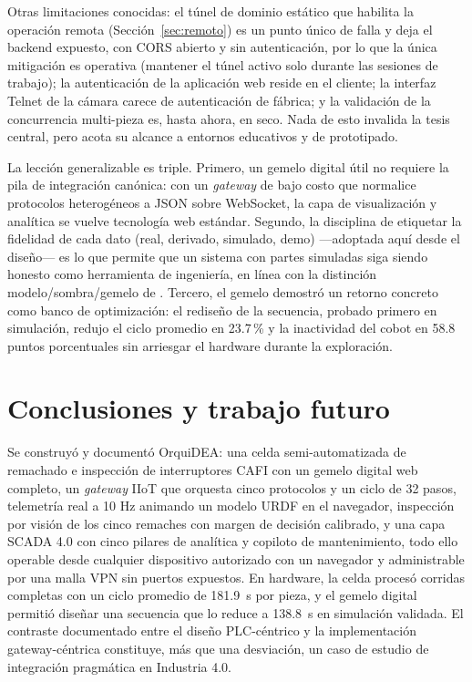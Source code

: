 \documentclass{styles/svproc}
\begin{document}
Otras limitaciones conocidas: el túnel de dominio estático que habilita la
operación remota (Sección~\ref{sec:remoto}) es un punto único de falla y
deja el backend expuesto, con CORS abierto y sin autenticación, por lo que
la única mitigación es operativa (mantener el túnel activo solo durante
las sesiones de trabajo); la autenticación de la
aplicación web reside en el cliente;
la interfaz Telnet de la cámara carece de autenticación de fábrica; y la
validación de la concurrencia multi-pieza es, hasta ahora, en seco. Nada de
esto invalida la tesis central, pero acota su alcance a entornos educativos
y de prototipado.

La lección generalizable es triple. Primero, un gemelo digital útil no
requiere la pila de integración canónica: con un \emph{gateway} de bajo
costo que normalice protocolos heterogéneos a JSON sobre WebSocket, la capa
de visualización y analítica se vuelve tecnología web estándar. Segundo, la
disciplina de etiquetar la fidelidad de cada dato (real, derivado, simulado,
demo) ---adoptada aquí desde el diseño--- es lo que permite que un sistema
con partes simuladas siga siendo honesto como herramienta de ingeniería, en
línea con la distinción modelo/sombra/gemelo de
\cite{kritzinger2018digital}. Tercero, el gemelo demostró un retorno
concreto como banco de optimización: el rediseño de la secuencia, probado
primero en simulación, redujo el ciclo promedio en 23.7\,\% y la
inactividad del cobot en 58.8 puntos porcentuales sin arriesgar el
hardware durante la exploración.

\section{Conclusiones y trabajo futuro}
Se construyó y documentó OrquiDEA: una celda semi-automatizada de remachado
e inspección de interruptores CAFI con un gemelo digital web completo, un
\emph{gateway} IIoT que orquesta cinco protocolos y un ciclo de 32 pasos,
telemetría real a 10 Hz animando un modelo URDF en el navegador, inspección
por visión de los cinco remaches con margen de decisión calibrado, y una
capa SCADA 4.0 con cinco pilares de analítica y copiloto de mantenimiento,
todo ello operable desde cualquier dispositivo autorizado con un navegador
y administrable por una malla VPN sin puertos expuestos.
En hardware, la celda procesó corridas completas con un ciclo promedio de
\SI{181.9}{\second} por pieza, y el gemelo digital permitió diseñar una
secuencia que lo reduce a \SI{138.8}{\second} en simulación validada. El
contraste documentado entre el diseño PLC-céntrico y la implementación
gateway-céntrica constituye, más que una desviación, un caso de estudio de
integración pragmática en Industria 4.0.
\end{document}
